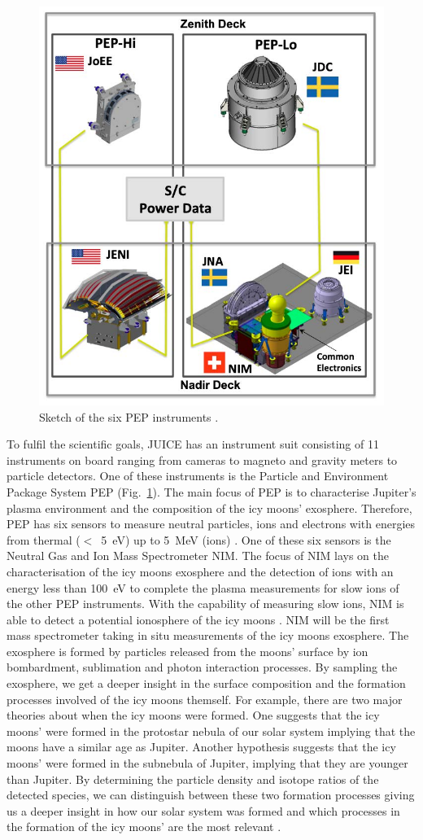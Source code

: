 	\begin{figure}[h]
		\centering
		\includegraphics[width=.7\textwidth]{Bilder/PEP_Instruments.jpg}
		\caption{Sketch of the six PEP instruments \cite{PEP_inst}.}
		\label{fig:PEPInst}
	\end{figure}
	To fulfil the scientific goals, JUICE has an instrument suit consisting of 11 instruments on board ranging from cameras to magneto and gravity meters to particle detectors. One of these instruments is the Particle and Environment Package System PEP (Fig.~\ref{fig:PEPInst}). The main focus of PEP is to characterise Jupiter's plasma environment and the composition of the icy moons' exosphere. Therefore, PEP has six sensors to measure neutral particles, ions and electrons with energies from thermal ($<$~5~eV) up to 5~MeV (ions) \cite{PEP_inst}. One of these six sensors is the Neutral Gas and Ion Mass Spectrometer NIM. The focus of NIM lays on the characterisation of the icy moons exosphere and the detection of ions with an energy less than 100~eV to complete the plasma measurements for slow ions of the other PEP instruments. With the capability of measuring slow ions, NIM is able to detect a potential ionosphere of the icy moons \cite{Diss_Meyer}. NIM will be the first mass spectrometer taking in situ measurements of the icy moons exosphere. The exosphere is formed by particles released from the moons' surface by ion bombardment, sublimation and photon interaction processes. By sampling the exosphere, we get a deeper insight in the surface composition and the formation processes involved of the icy moons themself. For example, there are two major theories about when the icy moons were formed. One suggests that the icy moons' were formed in the protostar nebula of our solar system implying that the moons have a similar age as Jupiter. Another hypothesis suggests that the icy moons' were formed in the subnebula of Jupiter, implying that they are younger than Jupiter. By determining the particle density and isotope ratios of the detected species, we can distinguish between these two formation processes giving us a deeper insight in how our solar system was formed and which processes in the formation of the icy moons' are the most relevant \cite[and references therein]{Vorburger2015}.\\
	
